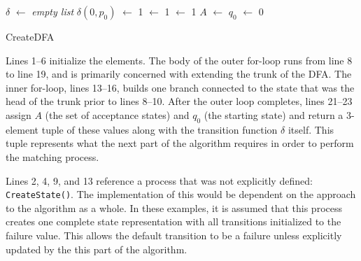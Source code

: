 \IncMargin{1em}
\begin{algorithm}[ht]
  \DontPrintSemicolon

  \BlankLine
  $\delta$ $\leftarrow$ \textit{empty list}\;
  \;
  $\delta(0, p_0)$ $\leftarrow$ 1\;
  \;
  \State $\leftarrow$ 1\;
  \NewState $\leftarrow$ 1\;
  $A$ $\leftarrow$ \State\;
  $q_0$ $\leftarrow$ 0\;
\caption{CreateDFA}
\label{alg:create_dfa}
\end{algorithm}
\DecMargin{1em}

Lines 1--6 initialize the elements. The body of the outer for-loop runs from line 8 to line 19, and is primarily concerned with extending the trunk of the DFA. The inner for-loop, lines 13--16, builds one branch connected to the state that was the head of the trunk prior to lines 8--10. After the outer loop completes, lines 21--23 assign $A$ (the set of acceptance states) and $q_0$ (the starting state) and return a 3-element tuple of these values along with the transition function $\delta$ itself. This tuple represents what the next part of the algorithm requires in order to perform the matching process.

Lines 2, 4, 9, and 13 reference a process that was not explicitly defined: \texttt{CreateState()}. The implementation of this would be dependent on the approach to the algorithm as a whole. In these examples, it is assumed that this process creates one complete state representation with all transitions initialized to the failure value. This allows the default transition to be a failure unless explicitly updated by the this part of the algorithm.

